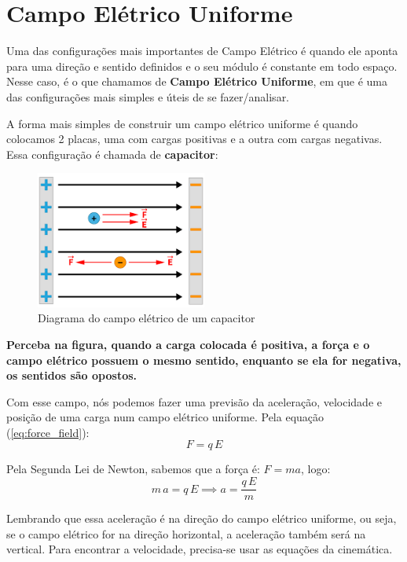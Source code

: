 \documentclass[12pt]{extarticle}
\newcommand{\<}{\langle}
\renewcommand{\>}{\rangle}
\theoremstyle{definition}
\begin{document}
\section{Campo Elétrico Uniforme}

Uma das configurações mais importantes de Campo Elétrico é quando ele aponta para uma direção e sentido definidos e o seu módulo é constante em todo espaço. Nesse caso, é o que chamamos de \textbf{Campo Elétrico Uniforme}, em que é uma das configurações mais simples e úteis de se fazer/analisar.

A forma mais simples de construir um campo elétrico uniforme é quando colocamos 2 placas, uma com cargas positivas e a outra com cargas negativas. Essa configuração é chamada de \textbf{capacitor}:
\begin{figure}[H]
    \centering
    \includegraphics[width=0.5\textwidth]{campo_eletrico_uniforme.png}
    \caption{Diagrama do campo elétrico de um capacitor}
    \label{fig:uniform_electric}
\end{figure}

\textbf{Perceba na figura, quando a carga colocada é positiva, a força e o campo elétrico possuem o mesmo sentido, enquanto se ela for negativa, os sentidos são opostos.}

Com esse campo, nós podemos fazer uma previsão da aceleração, velocidade e posição de uma carga num campo elétrico uniforme. Pela equação (\ref{eq:force_field}):
\begin{equation}
    F=q\,E
\end{equation}

Pela Segunda Lei de Newton, sabemos que a força é: $F =ma$, logo:
\begin{equation}
    m\,a=q\,E \implies \boxed{a = \frac{q\,E}{m}}
\end{equation}

Lembrando que essa aceleração é na direção do campo elétrico uniforme, ou seja, se o campo elétrico for na direção horizontal, a aceleração também será na vertical. Para encontrar a velocidade, precisa-se usar as equações da cinemática.
\end{document}
